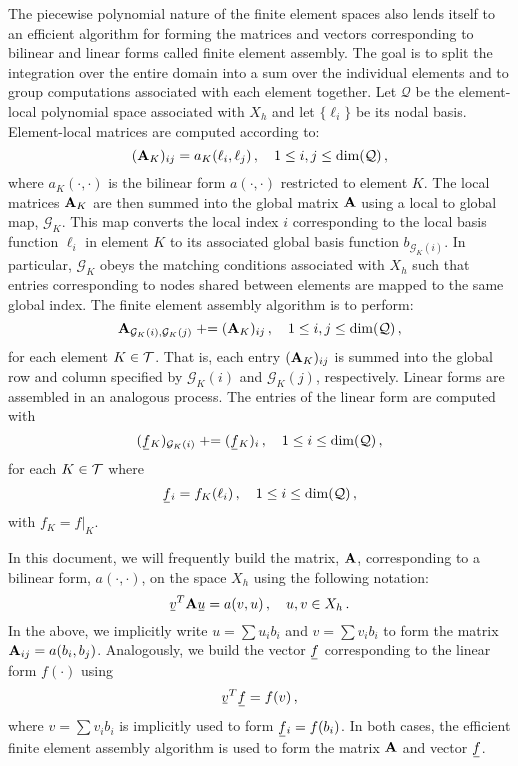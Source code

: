 \documentclass[../doc.tex]{subfiles}
\begin{document}
The piecewise polynomial nature of the finite element spaces also lends itself to an efficient algorithm for forming the matrices and vectors corresponding to bilinear and linear forms called finite element assembly. 
The goal is to split the integration over the entire domain into a sum over the individual elements and to group computations associated with each element together. 
Let $\mathcal{Q}$ be the element-local polynomial space associated with $X_h$ and let $\{\ell_i\}$ be its nodal basis. Element-local matrices are computed according to: 
	\begin{equation}
		(\boldsymbol{\mathrm{A}}_K)_{ij} = a_K(\ell_i, \ell_j) \,, \quad 1 \leq i,j \leq \dim(\mathcal{Q}) \,, 
	\end{equation}
where $a_K(\cdot,\cdot)$ is the bilinear form $a(\cdot,\cdot)$ restricted to element $K$. The local matrices $\boldsymbol{\mathrm{A}}_K$ are then summed into the global matrix $\boldsymbol{\mathrm{A}}$ using a local to global map, $\mathcal{G}_K$. This map converts the local index $i$ corresponding to the local basis function $\ell_i$ in element $K$ to its associated global basis function $b_{\mathcal{G}_K(i)}$. In particular, $\mathcal{G}_K$ obeys the matching conditions associated with $X_h$ such that entries corresponding to nodes shared between elements are mapped to the same global index. The finite element assembly algorithm is to perform: 
	\begin{equation}
		\boldsymbol{\mathrm{A}}_{\mathcal{G}_K(i), \mathcal{G}_K(j)} \mathrel{+}= (\boldsymbol{\mathrm{A}}_K)_{ij} \,, \quad 1\leq i,j \leq \dim(\mathcal{Q}) \,, 
	\end{equation} 
for each element $K \in \mathcal{T}$. That is, each entry $(\boldsymbol{\mathrm{A}}_K)_{ij}$ is summed into the global row and column specified by $\mathcal{G}_K(i)$ and $\mathcal{G}_K(j)$, respectively. Linear forms are assembled in an analogous process. The entries of the linear form are computed with  
	\begin{equation}
		(\ubar{f}_K)_{\mathcal{G}_K(i)} \mathrel{+}= (\ubar{f}_K)_i \,, \quad 1 \leq i \leq \dim(\mathcal{Q}) \,,
	\end{equation}
for each $K \in \mathcal{T}$ where 
	\begin{equation}
		\ubar{f}_i = f_K(\ell_i) \,, \quad 1\leq i \leq \dim(\mathcal{Q}) \,, 
	\end{equation}
with $f_K = f|_K$.  

In this document, we will frequently build the matrix, $\boldsymbol{\mathrm{A}}$, corresponding to a bilinear form, $a(\cdot,\cdot)$, on the space $X_h$ using the following notation: 
	\begin{equation}
		\ubar{v}^T \mat{A} \ubar{u} = a(v,u) \,, \quad u,v \in X_h \,. 
	\end{equation}
In the above, we implicitly write $u = \sum u_i b_i$ and $v = \sum v_i b_i$ to form the matrix $\boldsymbol{\mathrm{A}}_{ij} = a(b_i,b_j)$. Analogously, we build the vector $\ubar{f}$ corresponding to the linear form $f(\cdot)$ using  
	\begin{equation}
		\ubar{v}^T \ubar{f} = f(v) \,, 
	\end{equation}
where $v = \sum v_i b_i$ is implicitly used to form $\ubar{f}_i = f(b_i)$. In both cases, the efficient finite element assembly algorithm is used to form the matrix $\boldsymbol{\mathrm{A}}$ and vector $\ubar{f}$. 
\end{document}
